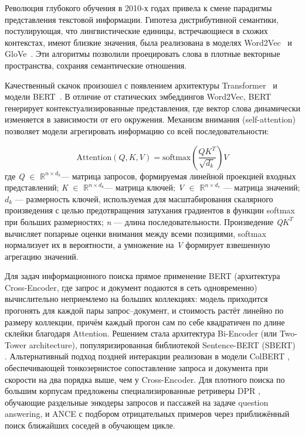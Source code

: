 \documentclass[a4paper, 12pt, oneside, openany]{article}
\begin{document}
Революция глубокого обучения в 2010-х годах привела к смене парадигмы представления текстовой информации. Гипотеза дистрибутивной семантики, постулирующая, что лингвистические единицы, встречающиеся в схожих контекстах, имеют близкие значения, была реализована в моделях Word2Vec~\cite{ref16} и GloVe~\cite{ref75}. Эти алгоритмы позволили проецировать слова в плотные векторные пространства, сохраняя семантические отношения.

Качественный скачок произошел с появлением архитектуры Transformer~\cite{ref17} и модели BERT~\cite{ref2}. В отличие от статических эмбеддингов Word2Vec, BERT генерирует контекстуализированные представления, где вектор слова динамически изменяется в зависимости от его окружения. Механизм внимания (self-attention) позволяет модели агрегировать информацию со всей последовательности:

\begin{equation}
	\mathrm{Attention}(Q,K,V) = \mathrm{softmax}\!\left( \frac{Q K^{T}}{\sqrt{d_{k}}} \right) V
	\label{eq:1-3}
\end{equation}
где \emph{Q} $\in$ \(\mathbb{R}^{n \times d_{k}}\)--- матрица запросов, формируемая линейной проекцией входных представлений; \emph{K} $\in$ \(\mathbb{R}^{n \times d_{k}}\)--- матрица ключей; \emph{V} $\in$ \(\mathbb{R}^{n \times d_{v}}\) --- матрица значений; \(d_{k}\) --- размерность ключей, используемая для масштабирования скалярного произведения с целью предотвращения затухания градиентов в функции softmax при больших размерностях; \emph{n} --- длина последовательности. Произведение \emph{Q}\(K^{T}\) вычисляет попарные оценки внимания между всеми позициями, softmax нормализует их в вероятности, а умножение на \emph{V} формирует взвешенную агрегацию значений.

Для задач информационного поиска прямое применение BERT (архитектура Cross-Encoder, где запрос и документ подаются в сеть одновременно) вычислительно неприемлемо на больших коллекциях: модель приходится прогонять для каждой пары запрос--документ, и стоимость растёт линейно по размеру коллекции, причём каждый прогон сам по себе квадратичен по длине склейки благодаря Attention. Решением стала архитектура Bi-Encoder (или Two-Tower architecture), популяризированная библиотекой Sentence-BERT (SBERT) \cite{ref3}. Альтернативный подход поздней интеракции реализован в модели ColBERT \cite{ref29}, обеспечивающей тонкозернистое сопоставление запроса и документа при скорости на два порядка выше, чем у Cross-Encoder. Для плотного поиска по большим корпусам предложены специализированные ретриверы DPR \cite{ref28}, обучающие раздельные энкодеры запросов и пассажей на задаче question answering, и ANCE \cite{ref79} с подбором отрицательных примеров через приближённый поиск ближайших соседей в обучающем цикле.
\end{document}
